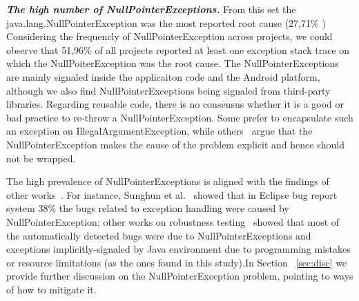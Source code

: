 \documentclass[conference]{IEEEtran}
\begin{document}
\emph{\textbf{The high number of NullPointerExceptions.}}
From this set the java.lang.NullPointerException was the most reported root cause (27,71\% )
Considering the frequencly of NullPointerException across projects, we could observe that
 51,96\% of all projects reported at least one exception stack trace on which the NullPoiterException
was the root cause.
 The NullPointerExceptions are mainly signaled inside the applicaiton code and the Android platform,
 although we also find NullPointerExceptions being signaled from third-party libraries. Regarding
reusable code, there is no consensus whether it is a good or bad practice to 
re-throw a NullPointerException. Some prefer to encapsulate such an exception on
IllegalArgumentException, while others~\cite{bloch2008effective} argue that the
NullPointerException makes the cause of the problem explicit and hence 
should not be wrapped.

The high prevalence of NullPointerExceptions is aligned with the findings of other 
works~\cite{kim2013predicting,fraser20131600,csallner2004jcrasher}. For instance, Sunghun et
al.~\cite{kim2013predicting} showed that in Eclipse bug report system 38\% the bugs 
related to exception handling were caused by NullPointerException; other works on robustness 
testing~\cite{maji2012empirical,csallner2004jcrasher} showed that most of the automatically 
detected bugs were due to NullPointerExceptions 
and exceptions implicitly-signaled by Java environment due to programming mistakes or resource limitations
 (as the ones found in this study).In Section ~\ref{sec:disc}  we provide further 
discussion on the NullPointerException problem, pointing 
to ways of how to mitigate it.

\end{document}
